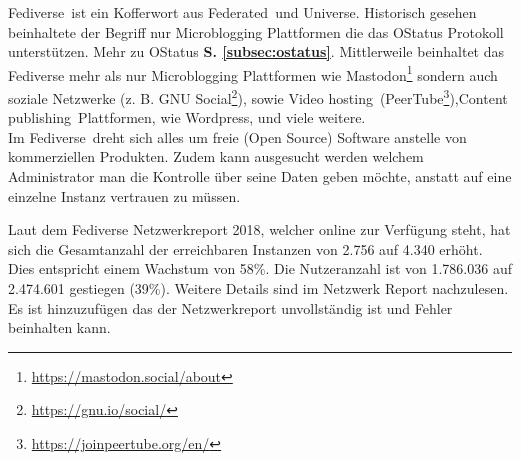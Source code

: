 {		\glqq Fediverse\grqq~ist ein Kofferwort aus \glqq Federated\grqq~und \glqq Universe\grqq. Historisch gesehen beinhaltete der Begriff nur Microblogging Plattformen die das OStatus Protokoll unterstützen. Mehr zu OStatus \textbf{S. \ref{subsec:ostatus}}. Mittlerweile beinhaltet das Fediverse mehr als nur Microblogging Plattformen wie Mastodon\footnote{\url{https://mastodon.social/about}} sondern auch soziale Netzwerke (z. B. GNU Social\footnote{\url{https://gnu.io/social/}}), sowie \glqq Video hosting\grqq~(PeerTube\footnote{\url{https://joinpeertube.org/en/}}),\glqq Content publishing\grqq~Plattformen, wie Wordpress, und viele weitere.\cite{fediverse}\\
		
		Im \glqq Fediverse\grqq~dreht sich alles um freie (Open Source) Software anstelle von kommerziellen Produkten. Zudem kann ausgesucht werden welchem Administrator man die Kontrolle über seine Daten geben möchte, anstatt auf eine einzelne Instanz vertrauen zu müssen.\cite{fediverse}\\
		
		Laut dem Fediverse Netzwerkreport 2018, welcher online zur Verfügung steht, hat sich die Gesamtanzahl der erreichbaren Instanzen von 2.756 auf 4.340 erhöht. Dies entspricht einem Wachstum von 58\%. Die Nutzeranzahl ist von 1.786.036 auf 2.474.601 gestiegen (39\%). Weitere Details sind im Netzwerk Report nachzulesen. Es ist hinzuzufügen das der Netzwerkreport unvollständig ist und Fehler beinhalten kann.\cite{fediverse-report}\\	
	}